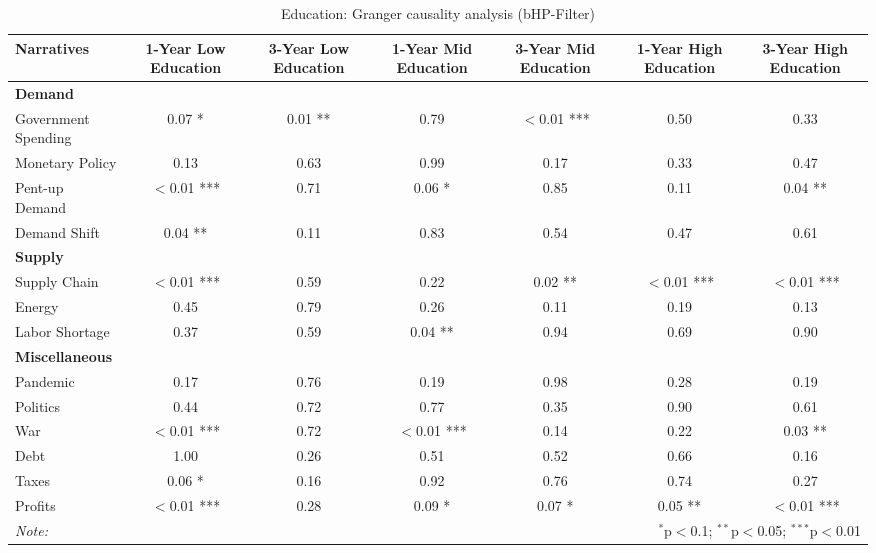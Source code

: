 \begin{sidewaystable}[ht]
\centering
\caption{Education: Granger causality analysis (bHP-Filter)}\label{table:granger}

\begin{tabular}{lcccccc}
\toprule
\textbf{Narratives} & \textbf{1-Year Low Education} & \textbf{3-Year Low Education} & \textbf{1-Year Mid Education} & \textbf{3-Year Mid Education} & \textbf{1-Year High Education} & \textbf{3-Year High Education} \\
\midrule
\multicolumn{7}{l}{\textbf{Demand}} \\
\midrule
Government Spending & 0.07 * & 0.01 ** & 0.79 & $<$0.01 *** & 0.50 & 0.33 \\
Monetary Policy & 0.13 & 0.63 & 0.99 & 0.17 & 0.33 & 0.47 \\
Pent-up Demand & $<$0.01 *** & 0.71 & 0.06 * & 0.85 & 0.11 & 0.04 ** \\
Demand Shift & 0.04 ** & 0.11 & 0.83 & 0.54 & 0.47 & 0.61 \\
\midrule
\multicolumn{7}{l}{\textbf{Supply}} \\
\midrule
Supply Chain & $<$0.01 *** & 0.59 & 0.22 & 0.02 ** & $<$0.01 *** & $<$0.01 *** \\
Energy & 0.45 & 0.79 & 0.26 & 0.11 & 0.19 & 0.13 \\
Labor Shortage & 0.37 & 0.59 & 0.04 ** & 0.94 & 0.69 & 0.90 \\
\midrule
\multicolumn{7}{l}{\textbf{Miscellaneous}} \\
\midrule
Pandemic & 0.17 & 0.76 & 0.19 & 0.98 & 0.28 & 0.19 \\
Politics & 0.44 & 0.72 & 0.77 & 0.35 & 0.90 & 0.61 \\
War & $<$0.01 *** & 0.72 & $<$0.01 *** & 0.14 & 0.22 & 0.03 ** \\
Debt & 1.00 & 0.26 & 0.51 & 0.52 & 0.66 & 0.16 \\
Taxes & 0.06 * & 0.16 & 0.92 & 0.76 & 0.74 & 0.27 \\
Profits & $<$0.01 *** & 0.28 & 0.09 * & 0.07 * & 0.05 ** & $<$0.01 *** \\
\midrule
\bottomrule
\textit{Note:}  & \multicolumn{6}{r}{$^{*}$p$<$0.1; $^{**}$p$<$0.05; $^{***}$p$<$0.01} \\
\bottomrule
\end{tabular}
\end{sidewaystable}
